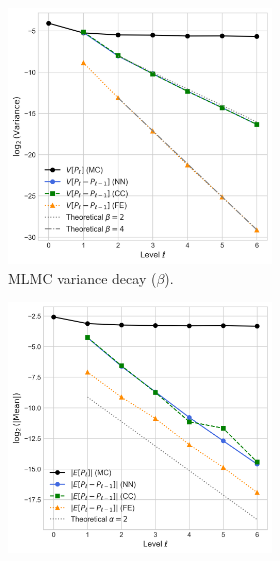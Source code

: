 \begin{figure}[htbp]
    \centering
    \begin{subfigure}{\textwidth}
        \centering
        \begin{subfigure}[b]{0.48\textwidth}
            \centering
            \includegraphics[width=\linewidth]{graphics/she_sq_amp_var_decay.png}
            \caption{MLMC variance decay ($\beta$).}
            \label{fig:variance_decay}
        \end{subfigure}
        \hfill
        \begin{subfigure}[b]{0.48\textwidth}
            \centering
            \includegraphics[width=\linewidth]{graphics/she_sq_amp_err_decay.png}

\end{subfigure}
\end{subfigure}
\end{figure}

